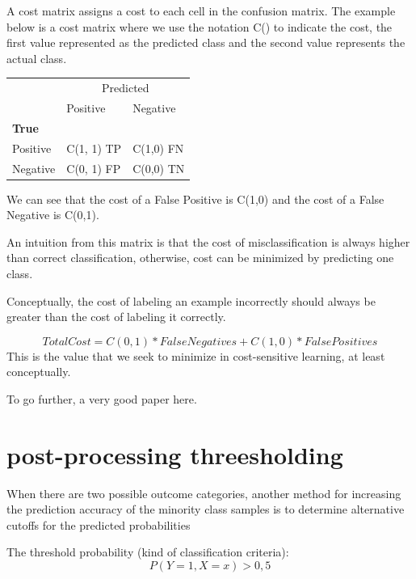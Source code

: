 \documentclass[
]{report}
\begin{document}
A cost matrix assigns a cost to each cell in the confusion matrix.
The example below is a cost matrix where we use the notation C() to indicate the cost, the first value represented as the predicted class and the second value represents the actual class. \citep{elkanCS}

\begin{table}
\centering
\begin{tabular}{l|l|l}
\hline
\multicolumn{1}{c|}{ } & \multicolumn{2}{c}{Predicted} \\
\cline{2-3}
  & Positive & Negative\\
\hline
\multicolumn{3}{l}{\textbf{True}}\\
\hline
\hspace{1em}Positive & C(1, 1) TP & C(1,0) FN\\
\hline
\hspace{1em}Negative & C(0, 1) FP & C(0,0) TN\\
\hline
\end{tabular}
\end{table}

We can see that the cost of a False Positive is C(1,0) and the cost of a False Negative is C(0,1).

An intuition from this matrix is that the cost of misclassification is always higher than correct classification, otherwise, cost can be minimized by predicting one class.

Conceptually, the cost of labeling an example incorrectly should always be greater than the cost of labeling it correctly.

\[Total Cost = C(0,1) * False Negatives + C(1,0) * False Positives\]
This is the value that we seek to minimize in cost-sensitive learning, at least conceptually.

To go further, a very good paper here. \citep{lingCS}

\hypertarget{post-processing-threesholding}{%
\section{post-processing threesholding}\label{post-processing-threesholding}}

When there are two possible outcome categories, another method for increasing the prediction accuracy of the minority class samples is to determine alternative cutoﬀs for the predicted probabilities

The threshold probability (kind of classification criteria): \[ P(Y=1, X=x) > 0,5\]
\end{document}
